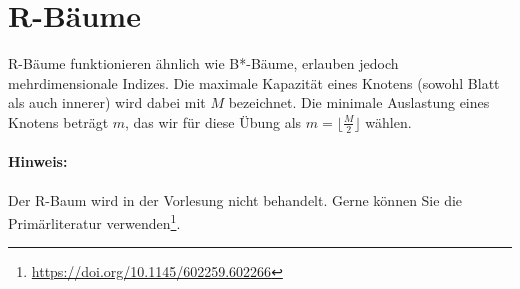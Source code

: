 \section{R-Bäume}
R-Bäume funktionieren ähnlich wie B*-Bäume, erlauben jedoch mehrdimensionale Indizes.
Die maximale Kapazität eines Knotens (sowohl Blatt als auch innerer) wird dabei mit $M$ bezeichnet.
Die minimale Auslastung eines Knotens beträgt $m$, das wir für diese Übung als $m = \lfloor\frac{M}{2}\rfloor$ wählen.

\paragraph{Hinweis:} Der R-Baum wird in der Vorlesung nicht behandelt.
Gerne können Sie die Primärliteratur verwenden\footnote{\url{https://doi.org/10.1145/602259.602266}}.

